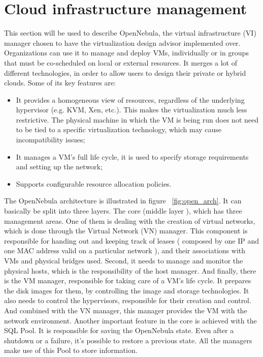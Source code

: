 \chapter{\textbf{Cloud infrastructure management}}
\label{chap:infrastructure}

This section will be used to describe OpenNebula, the virtual infrastructure (VI) manager chosen to have the virtualization design advisor implemented over. Organizations can use it to manage and deploy VMs, individually or in groups that must be co-scheduled on local or external resources. It merges a lot of different technologies, in order to allow users to design their private or hybrid clouds. Some of its key features are:
\begin{itemize}
 \item It provides a homogeneous view of resources, regardless of the underlying hypervisor (e.g. KVM, Xen, etc.). This makes the virtualization much less restrictive. The physical machine in which the VM is being run does not need to be tied to a specific virtualization technology, which may cause incompatibility issues;
  \item It manages a VM's full life cycle, it is used to specify storage requirements and setting up the network;
  \item Supports configurable resource allocation policies.
\end{itemize}

The OpenNebula architecture is illustrated in figure ~\ref{fig:open_arch}. It can basically be split into three layers. The core (middle layer ), which has three management areas. One of them is dealing with the creation of virtual networks, which is done through the Virtual Network (VN) manager. This component is responsible for handing out and keeping track of leases ( composed by one IP and one MAC address valid on a particular network ), and their associations with VMs and physical bridges used. Second, it needs to manage and monitor the physical hosts, which is the responsibility of the host manager. And finally, there is the VM manager, responsible for taking care of a VM's life cycle. It prepares the disk images for them, by controlling the image and storage technologies. It also needs to control the hypervisors, responsible for their creation and control. And combined with the VN manager, this manager provides the VM with the network environment. Another important feature in the core is achieved with 
the SQL Pool. It is responsible for saving the OpenNebula state. Even after a shutdown or a failure, it's possible to restore a previous state. All the managers make use of this Pool to store information.



